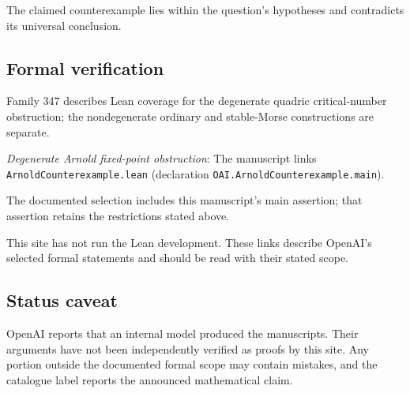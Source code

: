 \documentclass[11pt]{article}
\begin{document}
The claimed counterexample lies within the question’s hypotheses and contradicts its universal conclusion.

\subsection{Formal verification}
Family 347 describes Lean coverage for the degenerate quadric critical-number obstruction; the nondegenerate ordinary and stable-Morse constructions are separate.

\textit{Degenerate Arnold fixed-point obstruction}: The manuscript links \texttt{ArnoldCounterexample.lean} (declaration \texttt{OAI.ArnoldCounterexample.main}).

The documented selection includes this manuscript’s main assertion; that assertion retains the restrictions stated above.

This site has not run the Lean development. These links describe OpenAI’s selected formal statements and should be read with their stated scope.

\subsection{Status caveat}
OpenAI reports that an internal model produced the manuscripts. Their arguments have not been independently verified as proofs by this site. Any portion outside the documented formal scope may contain mistakes, and the catalogue label reports the announced mathematical claim.
\end{document}
